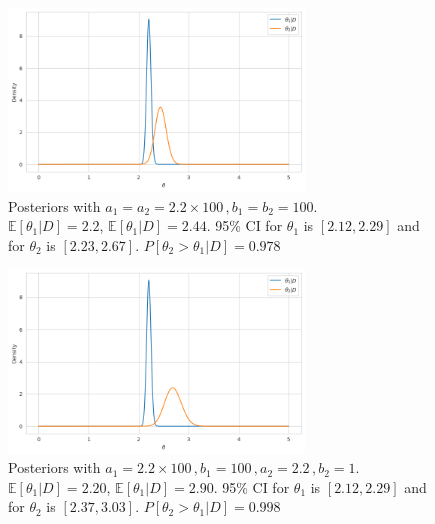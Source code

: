 \documentclass[11pt, letterpaper]{article}
\begin{document}
\begin{figure}[!h]
  \centering
  \includegraphics[width=0.7\textwidth]{4.5.c.1.png}
  \captionsetup{justification=centering}
  \caption{
    Posteriors with $a_1=a_2=2.2\times100\,, b_1=b_2=100$. \\
    $\mathbb{E}[\theta_1|D]=2.2$, $\mathbb{E}[\theta_1|D]=2.44$.
    95\% CI for $\theta_1$ is $[2.12, 2.29]$ and for $\theta_2$ is $[2.23, 2.67]$.
    $P[\theta_2 > \theta_1|D]=0.978$
  }
\end{figure}

\begin{figure}[!h]
  \centering
  \includegraphics[width=0.7\textwidth]{4.5.c.2.png}
  \captionsetup{justification=centering}
  \caption{
    Posteriors with $a_1=2.2\times100\,, b_1=100\,, a_2=2.2\,, b_2=1$. \\
    $\mathbb{E}[\theta_1|D]=2.20$, $\mathbb{E}[\theta_1|D]=2.90$.
    95\% CI for $\theta_1$ is $[2.12, 2.29]$ and for $\theta_2$ is $[2.37, 3.03]$.
    $P[\theta_2 > \theta_1|D]=0.998$
  }
\end{figure}
\end{document}
